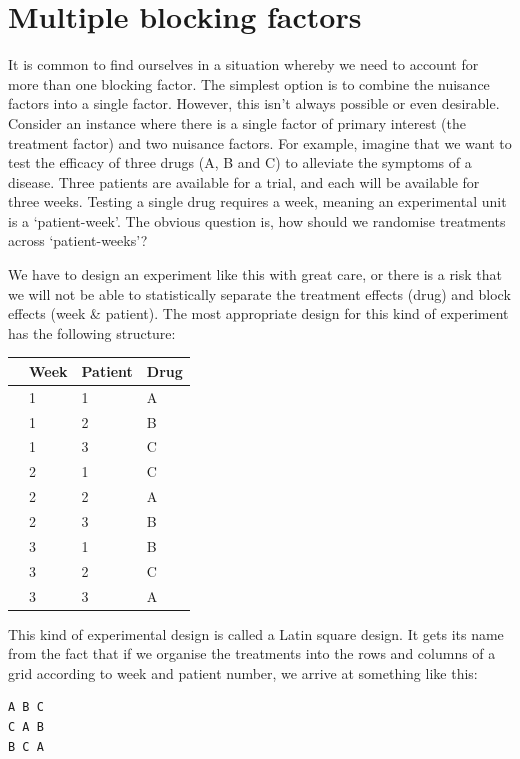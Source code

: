 \documentclass[
]{book}
\begin{document}
\hypertarget{multiple-blocking-factors}{%
\section{Multiple blocking factors}\label{multiple-blocking-factors}}

It is common to find ourselves in a situation whereby we need to account for more than one blocking factor. The simplest option is to combine the nuisance factors into a single factor. However, this isn't always possible or even desirable. Consider an instance where there is a single factor of primary interest (the treatment factor) and two nuisance factors. For example, imagine that we want to test the efficacy of three drugs (A, B and C) to alleviate the symptoms of a disease. Three patients are available for a trial, and each will be available for three weeks. Testing a single drug requires a week, meaning an experimental unit is a `patient-week'. The obvious question is, how should we randomise treatments across `patient-weeks'?

We have to design an experiment like this with great care, or there is a risk that we will not be able to statistically separate the treatment effects (drug) and block effects (week \& patient). The most appropriate design for this kind of experiment has the following structure:

\begin{longtable}[]{@{}clll@{}}
\toprule
& Week & Patient & Drug \\
\midrule
\endhead
& 1 & 1 & A \\
& 1 & 2 & B \\
& 1 & 3 & C \\
& 2 & 1 & C \\
& 2 & 2 & A \\
& 2 & 3 & B \\
& 3 & 1 & B \\
& 3 & 2 & C \\
& 3 & 3 & A \\
\bottomrule
\end{longtable}

This kind of experimental design is called a Latin square design. It gets its name from the fact that if we organise the treatments into the rows and columns of a grid according to week and patient number, we arrive at something like this:

\begin{verbatim}
A B C 
C A B 
B C A
\end{verbatim}
\end{document}
